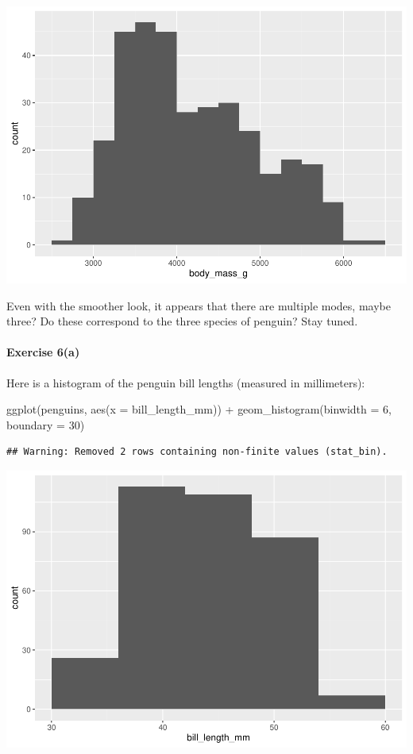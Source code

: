 \documentclass[
]{book}
\newenvironment{Shaded}{\begin{snugshade}}{\end{snugshade}}
\newcommand{\AttributeTok}[1]{\textcolor[rgb]{0.77,0.63,0.00}{#1}}
\newcommand{\DecValTok}[1]{\textcolor[rgb]{0.00,0.00,0.81}{#1}}
\newcommand{\FunctionTok}[1]{\textcolor[rgb]{0.00,0.00,0.00}{#1}}
\newcommand{\NormalTok}[1]{#1}
\newcommand{\SpecialCharTok}[1]{\textcolor[rgb]{0.00,0.00,0.00}{#1}}
\begin{document}
\includegraphics{intro_stats_files/figure-latex/unnamed-chunk-100-1.pdf}

Even with the smoother look, it appears that there are multiple modes, maybe three? Do these correspond to the three species of penguin? Stay tuned.

\hypertarget{exercise-6a-1}{%
\paragraph*{Exercise 6(a)}\label{exercise-6a-1}}

Here is a histogram of the penguin bill lengths (measured in millimeters):

\begin{Shaded}
\begin{Highlighting}[]
\FunctionTok{ggplot}\NormalTok{(penguins, }\FunctionTok{aes}\NormalTok{(}\AttributeTok{x =}\NormalTok{ bill\_length\_mm)) }\SpecialCharTok{+}
    \FunctionTok{geom\_histogram}\NormalTok{(}\AttributeTok{binwidth =} \DecValTok{6}\NormalTok{, }\AttributeTok{boundary =} \DecValTok{30}\NormalTok{)}
\end{Highlighting}
\end{Shaded}

\begin{verbatim}
## Warning: Removed 2 rows containing non-finite values (stat_bin).
\end{verbatim}

\includegraphics{intro_stats_files/figure-latex/unnamed-chunk-101-1.pdf}
\end{document}

